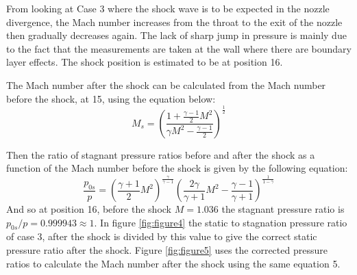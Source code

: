 \documentclass[8pt]{article}
\begin{document}
From looking at Case 3 where the shock wave is to be expected in the nozzle divergence, the Mach number increases from the throat to the exit of the nozzle then gradually decreases again.
The lack of sharp jump in pressure is mainly due to the fact that the measurements are taken at the wall where there are boundary layer effects.
The shock position is estimated to be at position 16.


The Mach number after the shock can be calculated from the Mach number before the shock, at 15, using the equation below:
\begin{equation}
    M_s = \left( \frac{1 + \frac{\gamma - 1}{2} M^2}{\gamma M^2 - \frac{\gamma - 1}{2}} \right) ^ \frac{1}{2}
\end{equation}

Then the ratio of stagnant pressure ratios before and after the shock as a function of the Mach number before the shock is given by the following equation:
\begin{equation}
    \frac{p_{0s}}{p} = \left( \frac{\gamma + 1}{2} M^2 \right) ^ \frac{\gamma}{\gamma - 1} \left( \frac{2\gamma}{\gamma+1}M^2 - \frac{\gamma-1}{\gamma+1}\right) ^ \frac{1}{1 - \gamma}
\end{equation}
And so at position 16, before the shock $M = 1.036$ the stagnant pressure ratio is $p_{0s}/p = 0.999943 \approx 1$.
In figure \ref{fig:figure4} the static to stagnation pressure ratio of case 3, after the shock is divided by this value to give the correct static pressure ratio after the shock.
Figure \ref{fig:figure5} uses the corrected pressure ratios to calculate the Mach number after the shock using the same equation 5.
\end{document}

